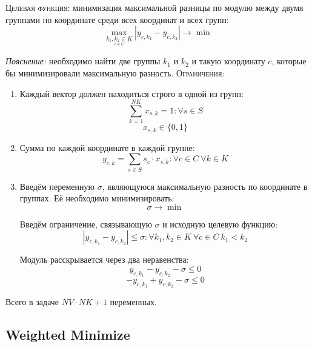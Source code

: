 \documentclass[%
10pt, %
final, %
oneside, %
onecolumn, %
centertags]{article} %
\theoremstyle{plain}
\theoremstyle{definition}
\theoremstyle{remark}
\begin{document}
\textsc{Целевая функция:} минимизация максимальной разницы по модулю между двумя группами по координате среди всех координат и всех групп:
$$\underset{\underset{c\in C}{k_1,k_2\in K}}{\max} \left \vert y_{c,k_1} - y_{c,k_2} \right \vert \to \min$$

\textit{Пояснение:} необходимо найти две группы $k_1$ и $k_2$ и такую координату $c$, которые бы минимизировали максимальную разность.
\newpage
\textsc{Ограничения}:

\begin{enumerate}
	\item Каждый вектор должен находиться строго в одной из групп: 
	$$\sum\limits_{k=1}^{NK}x_{s,k} = 1 : \forall s \in S$$
	$$x_{s,k} \in \{0,1\}$$
	\item Сумма по каждой координате в каждой группе:
	$$y_{c,k} = \sum\limits_{s\in S} s_c \cdot x_{s,k}: \forall c \in C \  \forall k \in K$$
	\item Введём переменную $\sigma$, являющуюся максимальную разность по координате в группах. Её необходимо минимизировать:
	$$\sigma \to \min$$

	Введём ограничение, связывающую $\sigma$ и исходную целевую функцию:
	$$\left\vert y_{c,k_1} - y_{c,k_2} \right\vert \leq \sigma : \forall k_1,k_2 \in K \ \forall c \in C \ k_1 < k_2$$

	Модуль расскрывается через два неравенства:
	$$y_{c,k_1} - y_{c,k_2} - \sigma \leq 0$$
	$$-y_{c,k_1} + y_{c,k_2} - \sigma \leq 0$$ 
\end{enumerate}

Всего в задаче $NV\cdot NK + 1$ переменных.

\newpage

\subsection{Weighted Minimize}
\end{document}
